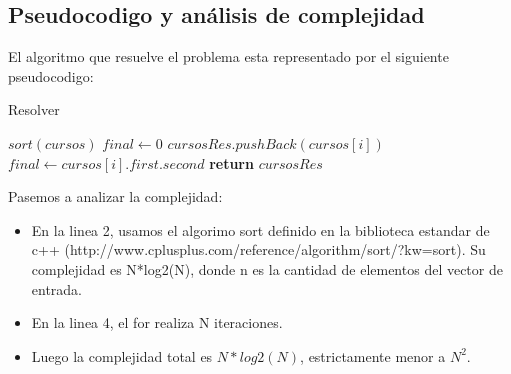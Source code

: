 \subsection{Pseudocodigo y an\'alisis de complejidad}

El algoritmo que resuelve el problema esta representado por el siguiente pseudocodigo:

\begin{algorithm}
\caption{Resolver}\label{resolver}
\begin{algorithmic}[1]
	\State $sort(cursos)$ 
	\State $final \gets 0$
		\State $ cursosRes.pushBack(cursos[i])$
		\State $final \gets cursos[i].first.second$
	\State \textbf{return} $cursosRes$
	\EndIf
	\EndFor 	
\EndProcedure		
\end{algorithmic}
\end{algorithm}

Pasemos a analizar la complejidad:

\begin{itemize}
  \item En la linea 2, usamos el algorimo sort definido en la biblioteca estandar de c++ (http://www.cplusplus.com/reference/algorithm/sort/?kw=sort).
Su complejidad es N*log2(N), donde n es la cantidad de elementos del vector de entrada.

  \item En la linea 4, el for realiza N iteraciones.
  \item Luego la complejidad total es $N*log2(N)$, estrictamente menor a $N^{2}$.

\end{itemize}


